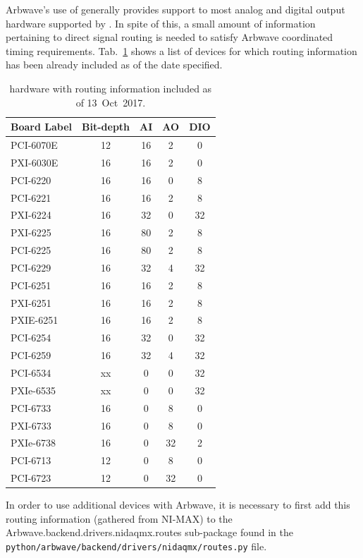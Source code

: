 Arbwave's use of  generally provides support to most
analog and digital output hardware supported by .  In spite of this,
a small amount of information pertaining to direct signal routing
is needed to satisfy Arbwave coordinated timing requirements.
Tab.~\ref{tab:daqmx} shows a list of  devices for which routing
information has been already included as of the date specified.

\begin{table}[ht!]
\centering
  \begin{tabular}{|l|cccc|}
    \hline
    Board Label & Bit-depth & AI & AO & DIO\footnotemark \\
    \hline
    \hline
    PCI-6070E & 12 & 16 & 2 & 0  \\
    PXI-6030E & 16 & 16 & 2 & 0  \\
    PCI-6220  & 16 & 16 & 0 & 8  \\
    PCI-6221  & 16 & 16 & 2 & 8  \\
    PXI-6224  & 16 & 32 & 0 & 32 \\
    PXI-6225  & 16 & 80 & 2 & 8  \\
    PCI-6225  & 16 & 80 & 2 & 8  \\
    PCI-6229  & 16 & 32 & 4 & 32 \\
    PCI-6251  & 16 & 16 & 2 & 8  \\
    PXI-6251  & 16 & 16 & 2 & 8  \\
    PXIE-6251 & 16 & 16 & 2 & 8  \\
    PCI-6254  & 16 & 32 & 0 & 32 \\
    PCI-6259  & 16 & 32 & 4 & 32 \\
    PCI-6534  & xx &  0 & 0 & 32 \\
    PXIe-6535 & xx &  0 & 0 & 32 \\
    PCI-6733  & 16 &  0 & 8 & 0  \\
    PXI-6733  & 16 &  0 & 8 & 0  \\
    PXIe-6738 & 16 &  0 & 32& 2  \\
    PCI-6713  & 12 &  0 & 8 & 0  \\
    PCI-6723  & 12 &  0 & 32& 0  \\
    \hline
  \end{tabular}
  \caption{
    \label{tab:daqmx}
     hardware with routing information included as of 13~Oct~2017.
  }
\end{table}

In order to use additional  devices with Arbwave, it is
necessary to first add this routing information (gathered from NI-MAX) to the
Arbwave.backend.drivers.nidaqmx.routes sub-package found in the\\
\noindent \texttt{python/arbwave/backend/drivers/nidaqmx/routes.py} file.

